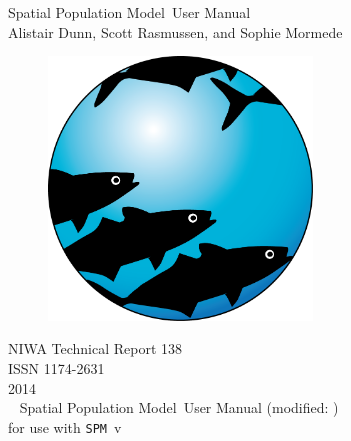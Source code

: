 \documentclass[a4paper,11pt,twoside,pdftex]{article}
\newcommand{\DocVer}{\SourceControlDateDoc}
\newcommand{\VER}{v} %
\newcommand{\SPM}{\texttt{SPM}} %
\newcommand{\SPMName}{Spatial Population Model} %
\begin{document}
\sloppy %


\begin{titlepage}
  \thispagestyle{empty} %
	\begin{center}

		\vspace*{2cm}
		\Huge \SPMName\ User Manual \\

		\vspace{1cm}
		\LARGE Alistair Dunn, Scott Rasmussen, and Sophie Mormede \\ %

		\vspace{2cm}
		\begin{figure}[htp]
			\begin{center}
			 \includegraphics[height=7cm,width=7cm]{Figures/SPM}
			\end{center}
		\end{figure}
		\vspace{2cm}

		\Large NIWA Technical Report 138 \\%
		\Large ISSN 1174-2631 \\%
		\Large 2014 \\%

		~\vfill
		\SPMName\ User Manual (modified: \DocVer) \\ for use with \SPM\ \VER

	\end{center}
\end{titlepage}
\end{document}
